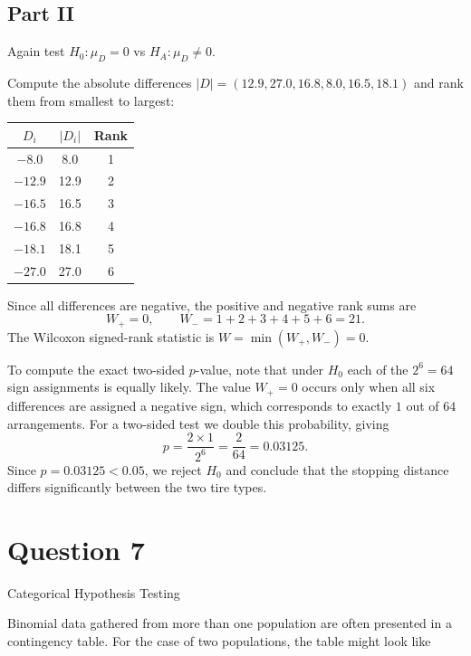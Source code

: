 \documentclass[letterpaper]{article}
\begin{document}
		\clearpage
		
		\subsection{Part II}
		
		Again test $H_0:\mu_D=0$ vs $H_A:\mu_D\ne 0$.
		
		Compute the absolute differences $|D|=(12.9,27.0,16.8,8.0,16.5,18.1)$ and rank them from smallest to largest:
		
		\begin{center}
			\begin{tabular}{ccc}
				\hline
				$D_i$ & $|D_i|$ & Rank \\
				\hline
				$-8.0$  & 8.0  & 1 \\
				$-12.9$ & 12.9 & 2 \\
				$-16.5$ & 16.5 & 3 \\
				$-16.8$ & 16.8 & 4 \\
				$-18.1$ & 18.1 & 5 \\
				$-27.0$ & 27.0 & 6 \\
				\hline
			\end{tabular}
		\end{center}
		
		Since all differences are negative, the positive and negative rank sums are
		$$W_+ = 0, \qquad W_- = 1+2+3+4+5+6 = 21.$$
		The Wilcoxon signed-rank statistic is $W = \min(W_+, W_-) = 0$.
		
		To compute the exact two-sided $p$-value, note that under $H_0$ each of the $2^6 = 64$ sign assignments is equally likely. The value $W_+ = 0$ occurs only when all six differences are assigned a negative sign, which corresponds to exactly $1$ out of $64$ arrangements. For a two-sided test we double this probability, giving
		$$p = \frac{2 \times 1}{2^6} = \frac{2}{64} = 0.03125.$$
		Since $p = 0.03125 < 0.05$, we reject $H_0$ and conclude that the stopping distance differs significantly between the two tire types.
		\clearpage
		
		\section{Question 7}
		
		{\color{deepred} Categorical Hypothesis Testing}
		
		\medskip
		
		Binomial data gathered from more than one population are often presented in a contingency table. 
		For the case of two populations, the table might look like
		
\end{document}
